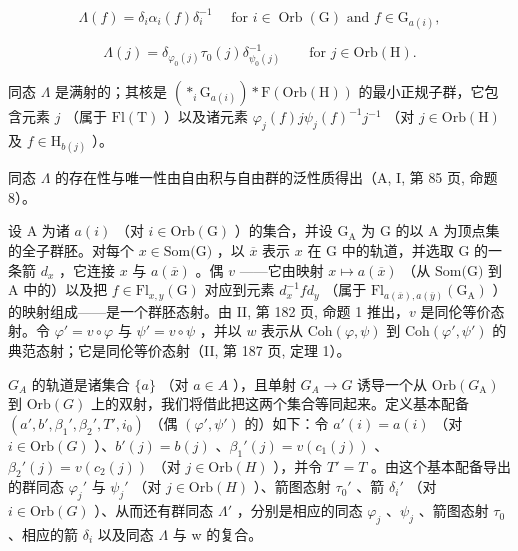\[
\Lambda (f) = \delta_ {i} \alpha_ {i} (f) \delta_ {i} ^ {- 1} \quad \text {   for   } i \in \operatorname{Orb} (\mathrm{G}) \text {   and   } f \in \mathrm{G} _ {a (i)},\tag{8}
\]

\[
\Lambda (j) = \delta_ {\varphi_ {0} (j)} \tau_ {0} (j) \delta_ {\psi_ {0} (j)} ^ {- 1} \qquad \text {for } j \in \mathrm{Orb} (\mathrm{H}).
\]

同态 \(\Lambda\) 是满射的；其核是 \((\ast_{i}\mathrm{G}_{a(i)})\ast\mathrm{F}(\mathrm{Orb}(\mathrm{H}))\) 的最小正规子群，它包含元素 \(j\) （属于 \(\mathrm{Fl}(\mathrm{T})\) ）以及诸元素 \(\varphi_{j}(f)j\psi_{j}(f)^{-1}j^{-1}\) （对 \(j\in\mathrm{Orb}(\mathrm{H})\) 及 \(f\in\mathrm{H}_{b(j)}\) ）。

同态 \(\Lambda\) 的存在性与唯一性由自由积与自由群的泛性质得出（A, I, 第 85 页, 命题 8）。

设 A 为诸 \(a(i)\) （对 \(i \in \mathrm{Orb}(\mathrm{G})\) ）的集合，并设 \(\mathrm{G}_{\mathrm{A}}\) 为 G 的以 A 为顶点集的全子群胚。对每个 \(x \in \text{Som(G)}\) ，以 \(\overline{x}\) 表示 \(x\) 在 G 中的轨道，并选取 G 的一条箭 \(d_x\) ，它连接 \(x\) 与 \(a(\overline{x})\) 。偶 \(v\) ——它由映射 \(x \mapsto a(\overline{x})\) （从 \(\text{Som(G)}\) 到 A 中的）以及把 \(f \in \text{Fl}_{x,y}(\text{G})\) 对应到元素 \(d_x^{-1}fd_y\) （属于 \(\text{Fl}_{a(\overline{x}),a(\overline{y})}(\text{G}_\text{A})\) ）的映射组成——是一个群胚态射。由 II, 第 182 页, 命题 1 推出，\(v\) 是同伦等价态射。令 \(\varphi' = v \circ \varphi\) 与 \(\psi' = v \circ \psi\) ，并以 \(w\) 表示从 \(\text{Coh}(\varphi, \psi)\) 到 \(\text{Coh}(\varphi', \psi')\) 的典范态射；它是同伦等价态射（II, 第 187 页, 定理 1）。

\(G_{A}\) 的轨道是诸集合 \(\{a\}\) （对 \(a \in A\) ），且单射 \(G_{A} \to G\) 诱导一个从 \(\mathrm{Orb}(G_{\mathrm{A}})\) 到 \(\mathrm{Orb}(G)\) 上的双射，我们将借此把这两个集合等同起来。定义基本配备 \((a', b', \beta_{1}', \beta_{2}', T', i_{0})\) （偶 \((\varphi', \psi')\) 的）如下：令 \(a'(i) = a(i)\) （对 \(i \in \mathrm{Orb}(G)\) ）、\(b'(j) = b(j)\) 、\(\beta_{1}'(j) = v(c_{1}(j))\) 、\(\beta_{2}'(j) = v(c_{2}(j))\) （对 \(j \in \mathrm{Orb}(H)\) ），并令 \(T' = T\) 。由这个基本配备导出的群同态 \(\varphi_{j}'\) 与 \(\psi_{j}'\) （对 \(j \in \mathrm{Orb}(H)\) ）、箭图态射 \(\tau_{0}'\) 、箭 \(\delta_{i}'\) （对 \(i \in \mathrm{Orb}(G)\) ）、从而还有群同态 \(\Lambda'\) ，分别是相应的同态 \(\varphi_{j}\) 、\(\psi_{j}\) 、箭图态射 \(\tau_{0}\) 、相应的箭 \(\delta_{i}\) 以及同态 \(\Lambda\) 与 w 的复合。

